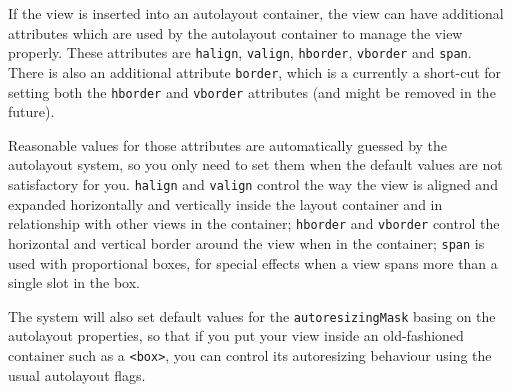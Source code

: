 If the view is inserted into an autolayout container, the view can
have additional attributes which are used by the autolayout container
to manage the view properly.  These attributes are \texttt{halign},
\texttt{valign}, \texttt{hborder}, \texttt{vborder} and \texttt{span}.  
There is also an additional attribute \texttt{border}, which is a
currently a short-cut for setting both the \texttt{hborder} and
\texttt{vborder} attributes (and might be removed in the future).

Reasonable values for those attributes are automatically guessed by
the autolayout system, so you only need to set them when the default
values are not satisfactory for you.  \texttt{halign} and
\texttt{valign} control the way the view is aligned and expanded 
horizontally and vertically inside the layout container and in
relationship with other views in the container; \texttt{hborder} and
\texttt{vborder} control the horizontal and vertical border around the
view when in the container; \texttt{span} is used with proportional
boxes, for special effects when a view spans more than a single slot
in the box.

The system will also set default values for the
\texttt{autoresizingMask} basing on the autolayout properties, so that
if you put your view inside an old-fashioned container such as a
\texttt{<box>}, you can control its autoresizing behaviour using the
usual autolayout flags.

